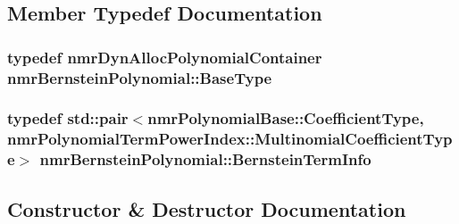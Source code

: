 \subsection{Member Typedef Documentation}
\hypertarget{classnmr_bernstein_polynomial_a8a0eb11ca4ee788e0f3714dd0e1f2e53}{}
\subsubsection[{Base\+Type}]{\setlength{\rightskip}{0pt plus 5cm}typedef {\bf nmr\+Dyn\+Alloc\+Polynomial\+Container} {\bf nmr\+Bernstein\+Polynomial\+::\+Base\+Type}}\label{classnmr_bernstein_polynomial_a8a0eb11ca4ee788e0f3714dd0e1f2e53}
\hypertarget{classnmr_bernstein_polynomial_ad8d87d00b90dcd2de08a43e90c07a0a6}{}
\subsubsection[{Bernstein\+Term\+Info}]{\setlength{\rightskip}{0pt plus 5cm}typedef std\+::pair$<${\bf nmr\+Polynomial\+Base\+::\+Coefficient\+Type}, {\bf nmr\+Polynomial\+Term\+Power\+Index\+::\+Multinomial\+Coefficient\+Type}$>$ {\bf nmr\+Bernstein\+Polynomial\+::\+Bernstein\+Term\+Info}}\label{classnmr_bernstein_polynomial_ad8d87d00b90dcd2de08a43e90c07a0a6}


\subsection{Constructor \& Destructor Documentation}
\hypertarget{classnmr_bernstein_polynomial_a7ef25e6984df6f2c6b4dbfc1ea2273cc}{}
